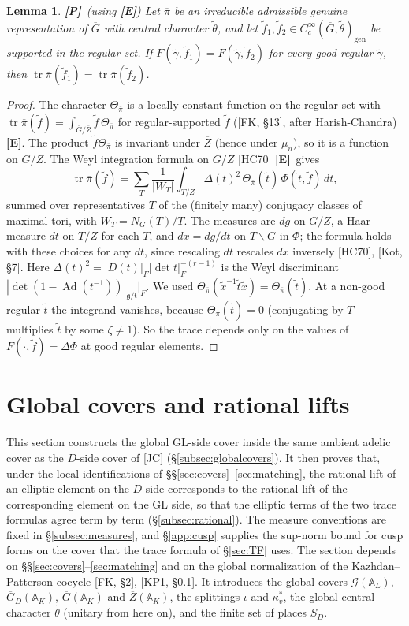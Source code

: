 \documentclass[12pt]{article}
\newcommand{\ov}[1]{\overline{#1}}
\newcommand{\A}{\mathbb{A}}
\newcommand{\gen}{\mathrm{gen}}
\newcommand{\tr}{\operatorname{tr}}
\newcommand{\Ad}{\operatorname{Ad}}
\newcommand{\GL}{\mathrm{GL}}
\newcommand{\Gb}{\ov{G}}
\newcommand{\Zb}{\ov{Z}}
\newcommand{\GDb}{\ov{G}_D}
\newcommand{\pib}{\ov{\pi}}
\newcommand{\ks}{\kappa^{*}}
\newcommand{\Tb}{\ov{T}}
\newcommand{\cGb}{\ov{\mathcal{G}}}
\newcommand{\Pv}{\textbf{[P]}}
\newcommand{\Ev}{\textbf{[E]}}
\theoremstyle{plain}
\newtheorem{lemma}[theorem]{Lemma}
\theoremstyle{definition}
\begin{document}
\begin{lemma}\label{lem:traceOI}\Pv\ (using \Ev)
Let $\pib$ be an irreducible admissible genuine representation of $\Gb$ with central character $\tilde\theta$, and let $\tilde f_1,\tilde f_2\in C_c^\infty(\Gb,\tilde\theta)_\gen$ be supported in the regular set. If $F(\tilde\gamma,\tilde f_1)=F(\tilde\gamma,\tilde f_2)$ for every good regular $\tilde\gamma$, then $\tr\pib(\tilde f_1)=\tr\pib(\tilde f_2)$.
\end{lemma}
\begin{proof}
The character $\Theta_{\pib}$ is a locally constant function on the regular set with $\tr\pib(\tilde f)=\int_{\Gb/\Zb}\tilde f\,\Theta_{\pib}$ for regular-supported $\tilde f$ ([FK, \S13], after Harish-Chandra) \Ev. The product $\tilde f\Theta_{\pib}$ is invariant under $\Zb$ (hence under $\mu_n$), so it is a function on $G/Z$. The Weyl integration formula on $G/Z$ [HC70] \Ev\ gives
\[ \tr\pib(\tilde f)=\sum_{T}\frac1{|W_T|}\int_{T/Z}\Delta(t)^2\,\Theta_{\pib}(\tilde t)\,\Phi(\tilde t,\tilde f)\,dt, \]
summed over representatives $T$ of the (finitely many) conjugacy classes of maximal tori, with $W_T=N_G(T)/T$. The measures are $dg$ on $G/Z$, a Haar measure $dt$ on $T/Z$ for each $T$, and $d\dot x=dg/dt$ on $T\backslash G$ in $\Phi$; the formula holds with these choices for any $dt$, since rescaling $dt$ rescales $d\dot x$ inversely [HC70], [Kot, \S7]. Here $\Delta(t)^2=|D(t)|_F|\det t|_F^{-(r-1)}$ is the Weyl discriminant $|\det(1-\Ad(t^{-1}))|_{\mathfrak g/\mathfrak t}|_F$. We used $\Theta_{\pib}(\tilde x^{-1}\tilde t\tilde x)=\Theta_{\pib}(\tilde t)$. At a non-good regular $\tilde t$ the integrand vanishes, because $\Theta_{\pib}(\tilde t)=0$ (conjugating by $\Tb$ multiplies $\tilde t$ by some $\zeta\ne1$). So the trace depends only on the values of $F(\cdot,\tilde f)=\Delta\Phi$ at good regular elements.
\end{proof}

\section{Global covers and rational lifts}\label{sec:global}
This section constructs the global $\GL$-side cover inside the same ambient adelic cover as the $D$-side cover of [JC] (\S\ref{subsec:globalcovers}). It then proves that, under the local identifications of \S\S\ref{sec:covers}--\ref{sec:matching}, the rational lift of an elliptic element on the $D$ side corresponds to the rational lift of the corresponding element on the $\GL$ side, so that the elliptic terms of the two trace formulas agree term by term (\S\ref{subsec:rational}). The measure conventions are fixed in \S\ref{subsec:measures}, and \S\ref{app:cusp} supplies the sup-norm bound for cusp forms on the cover that the trace formula of \S\ref{sec:TF} uses. The section depends on \S\S\ref{sec:covers}--\ref{sec:matching} and on the global normalization of the Kazhdan--Patterson cocycle [FK, \S2], [KP1, \S0.1]. It introduces the global covers $\cGb(\A_L)$, $\GDb(\A_K)$, $\Gb(\A_K)$ and $\Zb(\A_K)$, the splittings $\iota$ and $\ks_v$, the global central character $\tilde\theta$ (unitary from here on), and the finite set of places $S_D$.
\end{document}
